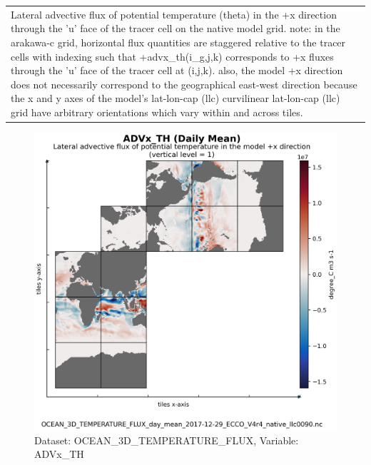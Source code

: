 \begin{longtable}{|m{}|m{}|m{}|m{}|}
\rowcolor{lightgray} \multicolumn{4}{|c|}{\textbf{Comments}} \\ \hline
\multicolumn{4}{|p{1\textwidth}|}{\footnotesize{{Lateral advective flux of potential temperature (theta) in the +x direction through the 'u' face of the tracer cell on the native model grid. note: in the arakawa-c grid, horizontal flux quantities are staggered relative to the tracer cells with indexing such that +advx\_th(i\_g,j,k) corresponds to +x fluxes through the 'u' face of the tracer cell at (i,j,k). also, the model +x direction does not necessarily correspond to the geographical east-west direction because the x and y axes of the model's lat-lon-cap (llc) curvilinear lat-lon-cap (llc) grid have arbitrary orientations which vary within and across tiles.}}} \\ \hline
\end{longtable}

\begin{figure}[H]
\centering
\includegraphics[scale=0.55]{../images/plots/native_plots/Ocean_Three-Dimensional_Potential_Temperature_Fluxes/ADVx_TH.png}
\caption{Dataset: OCEAN\_3D\_TEMPERATURE\_FLUX, Variable: ADVx\_TH}
\label{tab:table-OCEAN_3D_TEMPERATURE_FLUX_ADVx_TH-Plot}
\end{figure}
\newpage
\pagebreak
